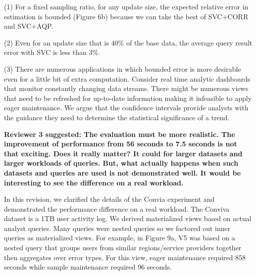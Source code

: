 
\noindent (1) For a fixed sampling ratio, for any update size, the expected relative error in estimation is bounded (Figure 6b) because we can take the best of SVC+CORR and SVC+AQP. 

\noindent  (2) Even for an update size that is 40\% of the base data, the average query result error with SVC is less than 3\%. 

\noindent  (3) There are numerous applications in which bounded error is more desirable even for a little bit of extra computation. Consider real time analytic dashboards that monitor constantly changing data streams. There might be numerous views that need to be refreshed for up-to-date information making it infeasible to apply eager maintenance. We argue that the confidence intervals provide analysts with the guidance they need to determine the statistical significance of a trend. 

\vspace{1.5em}

\textbf{Reviewer 3 suggested: The evaluation must be more realistic. The improvement of performance from 56 seconds to 7.5 seconds is not that exciting. Does it really matter? It could for larger datasets and larger workloads of queries. But, what actually happens when such datasets and queries are used is not demonstrated well. It would be interesting to see the difference on a real workload.}


In this revision, we clarified the details of the Convia experiment and demonstrated the performance difference on a real workload. The Conviva dataset is a 1TB user activity log. We derived materialized views based on actual analyst queries. Many queries were nested queries so we factored out inner queries as materialized views. For example, in Figure 9a, V5 was based on a nested query that groups users from similar regions/service providers together then aggregates over error types. For this view, eager maintenance required 858 seconds while sample maintenance required 96 seconds. 

